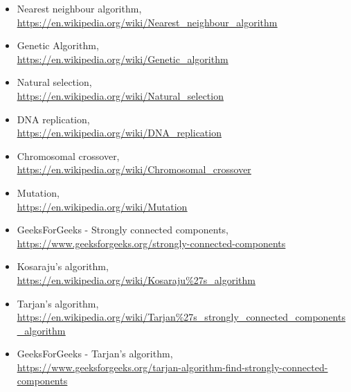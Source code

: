 \documentclass[article, a4paper, 12pt, oneside]{memoir}
\begin{document}
\begin{itemize}
	\item Nearest neighbour algorithm,\\
	\color{blue} \underline{\href{https://en.wikipedia.org/wiki/Nearest_neighbour_algorithm}{https://en.wikipedia.org/wiki/Nearest\_neighbour\_algorithm}} \color{black}
	\item Genetic Algorithm,\\
	\color{blue} \underline{\href{https://en.wikipedia.org/wiki/Genetic_algorithm}{https://en.wikipedia.org/wiki/Genetic\_algorithm}} \color{black}
	\item Natural selection,\\
	\color{blue} \underline{\href{https://en.wikipedia.org/wiki/Natural_selection}{https://en.wikipedia.org/wiki/Natural\_selection}} \color{black}
	\item DNA replication,\\
	\color{blue} \underline{\href{https://en.wikipedia.org/wiki/DNA_replication}{https://en.wikipedia.org/wiki/DNA\_replication}} \color{black}
	\item Chromosomal crossover,\\
	\color{blue} \underline{\href{https://en.wikipedia.org/wiki/Chromosomal_crossover}{https://en.wikipedia.org/wiki/Chromosomal\_crossover}} \color{black}
	\item Mutation,\\
	\color{blue} \underline{\href{https://en.wikipedia.org/wiki/Mutation}{https://en.wikipedia.org/wiki/Mutation}} \color{black}
	\item GeeksForGeeks - Strongly connected components,\\
	\color{blue} \underline{\href{https://www.geeksforgeeks.org/strongly-connected-components}{https://www.geeksforgeeks.org/strongly-connected-components}} \color{black}
	\item Kosaraju's algorithm,\\
	\color{blue} \underline{\href{https://en.wikipedia.org/wiki/Kosaraju\%27s_algorithm}{https://en.wikipedia.org/wiki/Kosaraju\%27s\_algorithm}} \color{black}
	\item Tarjan's algorithm,\\
	\color{blue} \underline{\href{https://en.wikipedia.org/wiki/Tarjan\%27s_strongly_connected_components_algorithm}{https://en.wikipedia.org/wiki/Tarjan\%27s\_strongly\_connected\_components\_algorithm}} \color{black}
	\item GeeksForGeeks - Tarjan's algorithm,\\
	\color{blue} \underline{\href{https://www.geeksforgeeks.org/tarjan-algorithm-find-strongly-connected-components}{https://www.geeksforgeeks.org/tarjan-algorithm-find-strongly-connected-components}} \color{black}

\end{itemize}
\end{document}
